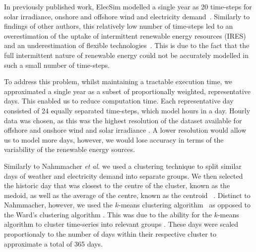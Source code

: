 In previously published work, ElecSim modelled a single year as 20 time-steps for solar irradiance, onshore and offshore wind and electricity demand~\cite{Kell}. Similarly to findings of other authors, this relatively low number of time-steps led to an overestimation of the uptake of intermittent renewable energy resources (IRES) and an underestimation of flexible technologies~\cite{Ludig2011,Haydt2011}. This is due to the fact that the full intermittent nature of renewable energy could not be accurately modelled in such a small number of time-steps.



To address this problem, whilst maintaining a tractable execution time, we approximated a single year as a subset of proportionally weighted, representative days. This enabled us to reduce computation time. Each representative day consisted of 24 equally separated time-steps, which model hours in a day. Hourly data was chosen, as this was the highest resolution of the dataset available for offshore and  onshore wind and solar irradiance \cite{Pfenninger2016}. A lower resolution would allow us to model more days, however, we would lose accuracy in terms of the variability of the renewable energy sources. 


Similarly to Nahmmacher \textit{et al.} we used a clustering technique to split similar days of weather and electricity demand into separate groups. We then selected the historic day that was closest to the centre of the cluster, known as the medoid, as well as the average of the centre, known as the centroid ~\cite{Nahmmacher2016}. Distinct to Nahmmacher, however, we used the $k$-means clustering algorithm~\cite{forgy65} as opposed to the Ward's clustering algorithm \cite{doi:10.1080/01621459.1963.10500845}. This was due to the ability for the $k$-means algorithm to cluster time-series into relevant groups \cite{Kell2018}. These days were scaled proportionaly to the number of days within their respective cluster to approximate a total of 365 days.

